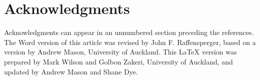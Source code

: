 \documentclass[12pt]{ORSNZ}
\begin{document}
\section*{Acknowledgments}

Acknowledgments can appear in an unnumbered section preceding the
references. The Word version of this article was revised by John F.
Raffensperger, based on a version by Andrew Mason, University of
Auckland. This LaTeX version was prepared by Mark Wilson and Golbon
Zakeri, University of Auckland, and updated by Andrew Mason
and Shane Dye.




\end{document}
